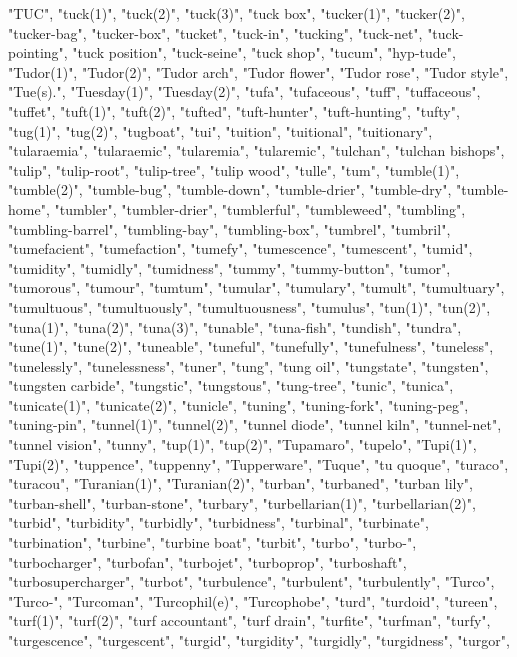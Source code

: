 "TUC",
"tuck(1)",
"tuck(2)",
"tuck(3)",
"tuck box",
"tucker(1)",
"tucker(2)",
"tucker-bag",
"tucker-box",
"tucket",
"tuck-in",
"tucking",
"tuck-net",
"tuck-pointing",
"tuck position",
"tuck-seine",
"tuck shop",
"tucum",
"hyp-tude",
"Tudor(1)",
"Tudor(2)",
"Tudor arch",
"Tudor flower",
"Tudor rose",
"Tudor style",
"Tue(s).",
"Tuesday(1)",
"Tuesday(2)",
"tufa",
"tufaceous",
"tuff",
"tuffaceous",
"tuffet",
"tuft(1)",
"tuft(2)",
"tufted",
"tuft-hunter",
"tuft-hunting",
"tufty",
"tug(1)",
"tug(2)",
"tugboat",
"tui",
"tuition",
"tuitional",
"tuitionary",
"tularaemia",
"tularaemic",
"tularemia",
"tularemic",
"tulchan",
"tulchan bishops",
"tulip",
"tulip-root",
"tulip-tree",
"tulip wood",
"tulle",
"tum",
"tumble(1)",
"tumble(2)",
"tumble-bug",
"tumble-down",
"tumble-drier",
"tumble-dry",
"tumble-home",
"tumbler",
"tumbler-drier",
"tumblerful",
"tumbleweed",
"tumbling",
"tumbling-barrel",
"tumbling-bay",
"tumbling-box",
"tumbrel",
"tumbril",
"tumefacient",
"tumefaction",
"tumefy",
"tumescence",
"tumescent",
"tumid",
"tumidity",
"tumidly",
"tumidness",
"tummy",
"tummy-button",
"tumor",
"tumorous",
"tumour",
"tumtum",
"tumular",
"tumulary",
"tumult",
"tumultuary",
"tumultuous",
"tumultuously",
"tumultuousness",
"tumulus",
"tun(1)",
"tun(2)",
"tuna(1)",
"tuna(2)",
"tuna(3)",
"tunable",
"tuna-fish",
"tundish",
"tundra",
"tune(1)",
"tune(2)",
"tuneable",
"tuneful",
"tunefully",
"tunefulness",
"tuneless",
"tunelessly",
"tunelessness",
"tuner",
"tung",
"tung oil",
"tungstate",
"tungsten",
"tungsten carbide",
"tungstic",
"tungstous",
"tung-tree",
"tunic",
"tunica",
"tunicate(1)",
"tunicate(2)",
"tunicle",
"tuning",
"tuning-fork",
"tuning-peg",
"tuning-pin",
"tunnel(1)",
"tunnel(2)",
"tunnel diode",
"tunnel kiln",
"tunnel-net",
"tunnel vision",
"tunny",
"tup(1)",
"tup(2)",
"Tupamaro",
"tupelo",
"Tupi(1)",
"Tupi(2)",
"tuppence",
"tuppenny",
"Tupperware",
"Tuque",
"tu quoque",
"turaco",
"turacou",
"Turanian(1)",
"Turanian(2)",
"turban",
"turbaned",
"turban lily",
"turban-shell",
"turban-stone",
"turbary",
"turbellarian(1)",
"turbellarian(2)",
"turbid",
"turbidity",
"turbidly",
"turbidness",
"turbinal",
"turbinate",
"turbination",
"turbine",
"turbine boat",
"turbit",
"turbo",
"turbo-",
"turbocharger",
"turbofan",
"turbojet",
"turboprop",
"turboshaft",
"turbosupercharger",
"turbot",
"turbulence",
"turbulent",
"turbulently",
"Turco",
"Turco-",
"Turcoman",
"Turcophil(e)",
"Turcophobe",
"turd",
"turdoid",
"tureen",
"turf(1)",
"turf(2)",
"turf accountant",
"turf drain",
"turfite",
"turfman",
"turfy",
"turgescence",
"turgescent",
"turgid",
"turgidity",
"turgidly",
"turgidness",
"turgor",
